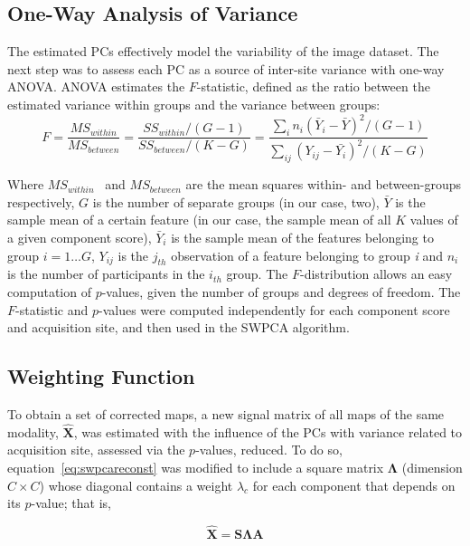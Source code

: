 \subsection{One-Way Analysis of Variance}
The estimated PCs effectively model the variability of the image dataset. The next step was to assess each PC as a source of inter-site variance with one-way \acf{ANOVA}. \ac{ANOVA} estimates the $F$-statistic, defined as the ratio between the estimated variance within groups and the variance between groups:
\begin{equation}
F=\frac{M{S}_{\mathit{within}}}{M{S}_{\mathit{between}}}=\frac{S{S}_{\mathit{within}}/(G-1)}{S{S}_{\mathit{between}}/(K-G)}=\frac{\sum
	_{i}{{n}_{i}{\left({\bar{{Y}}}_{i}-\bar{{Y}}\right)}^{2}/{\left(G-1\right)}}}{\sum
	_{\mathit{ij}}{{\left({Y}_{\mathit{ij}}-\bar{{{Y}_{i}}}\right)}^{2}/{\left(K-G\right)}}}
\end{equation}

Where  $M{S}_{\mathit{within}}$ \ and  $M{S}_{\mathit{between}}$ are the mean squares within- and between-groups respectively, $G$ is the number of separate groups (in our case, two),  $\bar{Y}$ is the sample mean of a certain feature (in our case, the sample mean of all $K$ values of a given component score),  ${\bar{Y}}_{i}$ is the sample mean of the features belonging to group $i=1\dots G$, ${Y}_{\mathit{ij}}$ is the $j_{th}$ observation of a feature belonging to group \textit{i} and  ${n}_{i}$ is the number of participants in the  $i_{th}$ group. The $F$-distribution allows an easy computation of $p$-values, given the number of groups and degrees of freedom. The $F$-statistic and $p$-values were computed independently for each component score and acquisition site, and then used in the \ac{SWPCA} algorithm.

\subsection{Weighting Function}
To obtain a set of corrected maps, a new signal matrix of all maps of the same modality,  $\widehat{\mathbf{X}}$, was estimated with the influence of the PCs with variance related to acquisition site, assessed via the $p$-values, reduced. To do so, equation~\ref{eq:swpcareconst} was modified to include a square matrix $\boldsymbol\Lambda$ (dimension $C\times C$) whose diagonal contains a weight ${\lambda }_{c}$ for each component that depends on its $p$-value; that is,

\begin{equation}
	\widehat{\mathbf{X}} = \mathbf{S}\boldsymbol{\Lambda}\mathbf{A}
\end{equation}

